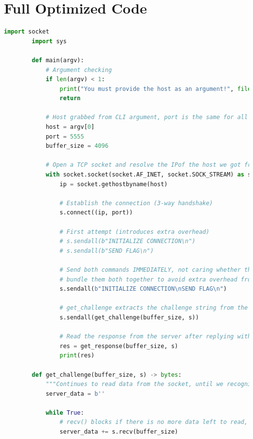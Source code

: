 \documentclass[11pt]{article}
\begin{document}
    \section{Full Optimized Code}\label{sec:full-optimized-code}

    \begin{lstlisting}[gobble=8,label={lst:full-code},language=Python,basicstyle={\scriptsize\ttfamily}]
        import socket
        import sys

        def main(argv):
            # Argument checking
            if len(argv) < 1:
                print("You must provide the host as an argument!", file = sys.stderr)
                return

            # Host grabbed from CLI argument, port is the same for all 3 vaults
            host = argv[0]
            port = 5555
            buffer_size = 4096

            # Open a TCP socket and resolve the IPof the host we got from the CLI
            with socket.socket(socket.AF_INET, socket.SOCK_STREAM) as s:
                ip = socket.gethostbyname(host)

                # Establish the connection (3-way handshake)
                s.connect((ip, port))

                # First attempt (introduces extra overhead)
                # s.sendall(b"INITIALIZE CONNECTION\n")
                # s.sendall(b"SEND FLAG\n")

                # Send both commands IMMEDIATELY, not caring whether there is data to read or not
                # bundle them both together to avoid extra overhead from sendall() being called twice
                s.sendall(b"INITIALIZE CONNECTION\nSEND FLAG\n")

                # get_challenge extracts the challenge string from the data the server sent us, and we just send it right back (part of protocol)
                s.sendall(get_challenge(buffer_size, s))

                # Read the response from the server after replying with the challenge string (hopefully we were quick enough!)
                res = get_response(buffer_size, s)
                print(res)

        def get_challenge(buffer_size, s) -> bytes:
            """Continues to read data from the socket, until we recognize the challenge string."""
            server_data = b''

            while True:
                # recv() blocks if there is no more data left to read, and the socket is still open
                server_data += s.recv(buffer_size)


\end{lstlisting}
\end{document}
